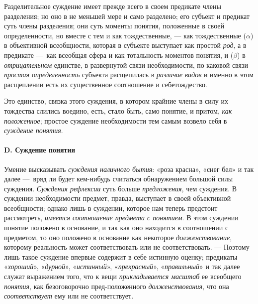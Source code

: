 \documentclass[twoside]{article}
\begin{document}
{{Разделительное суждение имеет прежде всего в своем предикате
члены разделения; но оно в не меньшей мере и само разделено; его субъект и
предикат суть члены разделения; они суть моменты понятия, положенные в
своей определенности, но вместе с тем и как тождественные, —
как тождественные ($\alpha $) в объективной всеобщности,
которая в субъекте выступает как простой
{\em род}, а в предикате
—~как всеобщая сфера и как тотальность моментов понятия, и
($\beta $) в {\em отрицательном}
единстве, в развернутой связи необходимости, по каковой связи
{\em простая определенность}
субъекта расщепилась в
{\em различие видов} и
именно в этом расщеплении есть их существенное соотношение и
себетождество.

Это единство, связка этого суждения, в котором крайние члены в
силу их тождества слились воедино, есть, стало быть, само понятие, и
притом, {\em как положенное};
простое суждение необходимости тем самым возвело себя в
{\em суждение понятия}.

\paragraph[D. Суждение понятия]{D. Суждение понятия}
Умение высказывать
{\em суждения наличного бытия}:
«роза красна», «снег бел» и так далее —~вряд
ли будет кем-нибудь считаться обнаружением большой силы суждения.
{\em Суждения рефлексии}
суть больше
{\em предложения}, чем
суждения. В суждении необходимости предмет, правда,
выступает в своей объективной всеобщности; однако лишь в суждении, которое
нам теперь предстоит рассмотреть,
{\em имеется соотношение предмета с
понятием}. В этом суждении понятие положено в основание, и
так как оно находится в соотношении с предметом, то оно положено в
основание как некоторое
{\em долженствование},
которому реальность может соответствовать или не
соответствовать. — Поэтому лишь такое суждение впервые
содержит в себе истинную оценку; предикаты
«{\em хороший}»,
«{\em дурной}»,
«{\em истинный}»,
«{\em прекрасный}»,
«{\em правильный}» и так
далее служат выражением того, что к вещи
{\em прикладывается масштаб} ее всеобщего
{\em понятия}, как
безоговорочно пред-положенного
{\em долженствования},
что она
{\em соответствует} ему
или не соответствует.

}}
\end{document}
